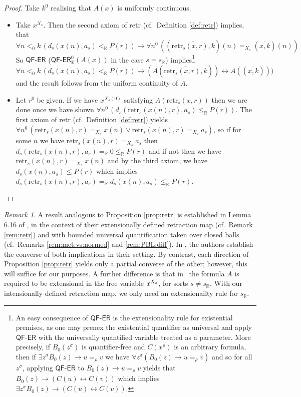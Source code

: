 \documentclass[11pt]{amsart}
\theoremstyle{definition}
\theoremstyle{remark}
\newtheorem{remark}[theorem]{Remark}
\def\RR{\mathbb{R}}
\newcommand{\QFER}{\textsf{QF}\mbox{-}\textsf{ER}}
\begin{document}
\begin{proof}
  Take $k^0$ realising that $A(x)$ is uniformly continuous.
  \begin{itemize}
      \item Take $x^{X_s}$. Then the second axiom of $\mathrm{retr}$ (cf.\ Definition \ref{def:retr}) implies, that
      \[
      \forall n <_0 k\, (d_s(x(n),a_s)<_\RR P(r)) \to \forall n^0\,((\overline{\mathrm{retr}_s(x,r),k})(n) =_{X_s}  (\overline{x,k})(n))
      \]
       So $\QFER$ ($\QFER^0_\RR(A(x))$ in the case $s= s_\RR$) implies\footnote{An easy consequence of $\QFER$ is the extensionality rule for existential premises, as one may prenex the existential quantifier as universal and apply $\QFER$ with the universally quantified variable treated as a parameter. More precisely, if $B_0(z^\sigma)$ is quantifier-free and $C(x^\rho)$ is an arbitrary formula, then if $\exists z^\sigma B_0(z) \to u=_{\rho} v$ we have $\forall z^\sigma (B_0(z) \to u=_{\rho} v)$ and so for all $z^\sigma$, applying $\QFER$ to $B_0(z) \to u=_{\rho} v$ yields that $B_0(z) \to (C(u)\leftrightarrow C(v))$ which implies $\exists z^\sigma B_0(z) \to (C(u)\leftrightarrow C(v))$.}  
         \[
      \forall n <_0 k\, (d_s(x(n),a_s)<_\RR P(r)) \to (A(\overline{\mathrm{retr}_s(x,r),k})) \leftrightarrow  A((\overline{x,k})))
      \]
     and the result follows from the uniform continuity of $A$.
      \item Let $r^0$ be given. If we have $x^{X_s(0)}$ satisfying $A(\mathrm{retr}_s(x,r))$ then we are done once we have shown $\forall n^0\,(d_s(\mathrm{retr}_s(x(n),r),a_s)\le_{\RR} P(r))$. The first axiom of $\mathrm{retr}$ (cf.\ Definition \ref{def:retr}) yields $\forall n^0\,(\mathrm{retr}_s(x(n),r) =_{X_s} x(n) \lor \mathrm{retr}_s(x(n),r) =_{X_s}  a_{s})$, so if for some $n$ we have $\mathrm{retr}_s(x(n),r) =_{X_s}  a_{s}$ then $d_s(\mathrm{retr}_s(x(n),r),a_s) =_\RR 0\le_{\RR} P(r)$ and if not then we have $\mathrm{retr}_s(x(n),r) =_{X_s} x(n)$ and by the third axiom, we have $d_s(x(n),a_s) \le P(r)$  which implies $d_s(\mathrm{retr}_s(x(n),r),a_s) =_\RR d_s(x(n),a_s)\le_{\RR} P(r)$.
  \end{itemize}

\end{proof}
\begin{remark}
 A result analogous to Proposition \ref{prop:retr} is established in
Lemma 6.16 of \cite{GuK2016}, in the context of their extensionally defined
retraction map (cf.\ Remark \ref{rem:retr}) and with bounded universal
quantification taken over closed balls (cf.\ Remarks \ref{rem:met:vs:normed}
and \ref{rem:PBL:diff}). In \cite{GuK2016}, the authors establish the converse of both implications in
their setting. By contrast, each direction of Proposition \ref{prop:retr}
yields only a partial converse of the other; however, this will suffice for
our purposes. A further difference is that in~\cite{GuK2016} the formula $A$ is required to
be extensional in the free variable $x^{\Tilde{X}_{s}}$, for sorts $s \neq s_\RR$.
With our intensionally defined retraction map, we only need an extensionailty rule for $s_\RR$.
\end{remark}
\end{document}
